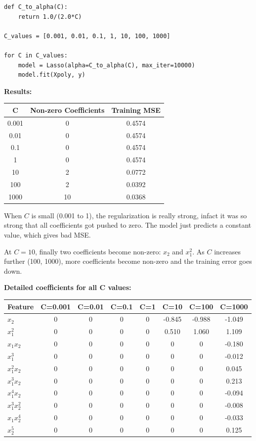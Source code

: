 \documentclass[11pt,a4paper]{article}
\begin{document}
\begin{lstlisting}
def C_to_alpha(C):
    return 1.0/(2.0*C)

C_values = [0.001, 0.01, 0.1, 1, 10, 100, 1000]

for C in C_values:
    model = Lasso(alpha=C_to_alpha(C), max_iter=10000)
    model.fit(Xpoly, y)
\end{lstlisting}

\textbf{Results:}

\begin{table}[H]
\centering
\begin{tabular}{ccc}
\toprule
C & Non-zero Coefficients & Training MSE \\
\midrule
0.001 & 0 & 0.4574 \\
0.01 & 0 & 0.4574 \\
0.1 & 0 & 0.4574 \\
1 & 0 & 0.4574 \\
10 & 2 & 0.0772 \\
100 & 2 & 0.0392 \\
1000 & 10 & 0.0368 \\
\bottomrule
\end{tabular}
\end{table}

When $C$ is small (0.001 to 1), the regularization is really strong, infact it was so strong that all coefficients got pushed to zero. The model just predicts a constant value, which gives bad MSE.

At $C=10$, finally two coefficients become non-zero: $x_2$ and $x_1^2$. As $C$ increases further (100, 1000), more coefficients become non-zero and the training error goes down.

\textbf{Detailed coefficients for all C values:}

\begin{table}[H]
\centering
\small
\begin{tabular}{lccccccc}
\toprule
Feature & C=0.001 & C=0.01 & C=0.1 & C=1 & C=10 & C=100 & C=1000 \\
\midrule
$x_2$ & 0 & 0 & 0 & 0 & -0.845 & -0.988 & -1.049 \\
$x_1^2$ & 0 & 0 & 0 & 0 & 0.510 & 1.060 & 1.109 \\
$x_1x_2$ & 0 & 0 & 0 & 0 & 0 & 0 & -0.180 \\
$x_1^3$ & 0 & 0 & 0 & 0 & 0 & 0 & -0.012 \\
$x_1^2x_2$ & 0 & 0 & 0 & 0 & 0 & 0 & 0.045 \\
$x_1^3x_2$ & 0 & 0 & 0 & 0 & 0 & 0 & 0.213 \\
$x_1^4x_2$ & 0 & 0 & 0 & 0 & 0 & 0 & -0.094 \\
$x_1^3x_2^2$ & 0 & 0 & 0 & 0 & 0 & 0 & -0.008 \\
$x_1x_2^4$ & 0 & 0 & 0 & 0 & 0 & 0 & -0.033 \\
$x_2^5$ & 0 & 0 & 0 & 0 & 0 & 0 & 0.125 \\
\bottomrule
\end{tabular}
\end{table}
\end{document}
